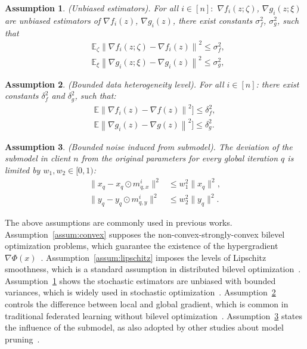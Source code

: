 \documentclass[lettersize,journal]{IEEEtran}
\newtheorem{assumption}{Assumption}
\begin{document}
\begin{assumption}\label{assum:sto_sample}(Unbiased estimators).
For all $i\in [n]:$
$\nabla f_i(z;\zeta)$, $\nabla g_i(z;\xi)$ are unbiased estimators of $\nabla f_i(z)$, $\nabla g_i(z)$, there exist constants $\sigma_f^2$, $\sigma^2_{g}$, such that 
\begin{align}
    &\mathbb{E}_{\zeta}\left\|\nabla f_i(z;\zeta)-\nabla f_i(z)\right\|^2\leq \sigma_f^2,
    \\
    &\mathbb{E}_{\xi}\left\|\nabla g_i(z;\xi)-\nabla g_i(z)\right\|^2\leq \sigma_{g}^2,
\end{align}
\end{assumption}

\begin{assumption}\label{assum:hetero}
     (Bounded data heterogeneity level). For all $i\in[n]$: there exist constants $\delta^2_f$ and $\delta^2_g$, such that:
     \begin{align}
         \mathbb{E}\left\|\nabla f_i(z)-\nabla f(z)\right\|^2]\leq \delta^2_f,\\
         \mathbb{E}\left\|\nabla g_i(z)-\nabla g(z)\right\|^2]\leq \delta^2_g.        
     \end{align}
\end{assumption}

\begin{assumption}\label{assum:mask}
    (Bounded noise induced from submodel). The deviation of the submodel in client $n$ from the original parameters for every global iteration $q$ is limited by $w_1,w_2\in[0,1)$:
\begin{align}
        \|x_q-x_q\odot m_{q,x}^i\|^2 &\leq w_1^2\|x_q\|^2,\\
        \|y_q-y_q\odot m_{q,y}^i\|^2 &\leq w_2^2\|y_q\|^2.
\end{align}
\end{assumption}

The above assumptions are commonly used in previous works. Assumption~\ref{assum:convex} supposes the non-convex-strongly-convex bilevel optimization problems, which guarantee the existence of the hypergradient $\nabla\Phi(x)$~\cite{kwon2023fully,FdeHBO}. 
Assumption~\ref{assum:lipschitz} imposes the levels of Lipschitz smoothness, which is a standard assumption in distributed bilevel optimization~\cite{xiao2023communication,yang2024simfbo}.
Assumption~\ref{assum:sto_sample} shows the stochastic estimators are unbiased with bounded variances, which is widely used in stochastic optimization~\cite{tarzanagh2022fednest,conf/icml/fedmbo}. 
Assumption~\ref{assum:hetero} controls the difference between local and global gradient, which is common in traditional federated learning without bilevel optimization~\cite{li2019convergence,yuan2022convergence}.
Assumption~\ref{assum:mask} states the influence of the submodel, as also adopted by other studies about model pruning~\cite{wang2023theoretical,zhou2024every}.
\end{document}
